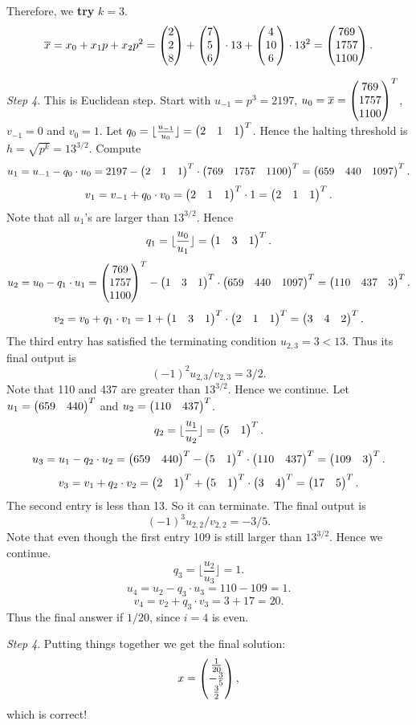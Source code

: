 \documentclass[12pt]{article}
\theoremstyle{plain}
\begin{document}
Therefore, we {\bf try} $k=3$.
$$\overline{x} = x_0 + x_1p+x_2p^2 = \begin{pmatrix}2\\2\\8\end{pmatrix} + \begin{pmatrix}7\\5\\6\end{pmatrix} \cdot 13 + \begin{pmatrix}4\\10\\6\end{pmatrix} \cdot 13^2 = \begin{pmatrix}769\\1757\\1100\end{pmatrix}.$$

\emph{Step 4}. This is Euclidean step. Start with $u_{-1} = p^3 = 2197$, $u_0=\overline{x} = \begin{pmatrix}769\\1757\\1100\end{pmatrix}^T$, $v_{-1} = 0$ and $v_0=1$. Let $q_0 = \lfloor \frac{u_{-1}}{u_0} \rfloor = \begin{pmatrix}2 & 1 & 1\end{pmatrix}^T$. Hence the halting threshold is $h = \sqrt{p^k} = 13^{3/2}$. Compute
$$u_1 = u_{-1} - q_0\cdot u_0 = 2197 - \begin{pmatrix}2 & 1 & 1\end{pmatrix}^T \cdot \begin{pmatrix}769 & 1757 & 1100\end{pmatrix}^T = \begin{pmatrix}659 & 440 & 1097\end{pmatrix}^T.$$
$$v_1 = v_{-1} + q_0\cdot v_0 = \begin{pmatrix}2 & 1 & 1\end{pmatrix}^T \cdot 1 = \begin{pmatrix}2 & 1 & 1\end{pmatrix}^T.$$
Note that all $u_1$'s are larger than $13^{3/2}$. Hence
$$q_1 = \lfloor \frac{u_0}{u_1} \rfloor = \begin{pmatrix}1 & 3 & 1\end{pmatrix}^T.$$
$$u_2 = u_0 - q_1\cdot u_1 = \begin{pmatrix}769\\1757\\1100\end{pmatrix}^T - \begin{pmatrix}1 & 3 & 1\end{pmatrix}^T \cdot \begin{pmatrix}659 & 440 & 1097\end{pmatrix}^T = \begin{pmatrix}110 & 437 & 3\end{pmatrix}^T.$$
$$v_2 = v_0 + q_1\cdot v_1 = 1 + \begin{pmatrix}1 & 3 & 1\end{pmatrix}^T \cdot \begin{pmatrix}2 & 1 & 1\end{pmatrix}^T = \begin{pmatrix}3&4&2\end{pmatrix}^T.$$
The third entry has satisfied the terminating condition $u_{2,3} = 3 < 13$. Thus its final output is 
$$(-1)^2u_{2,3}/v_{2,3} = 3/2.$$
Note that 110 and 437 are greater than $13^{3/2}$. Hence we continue. Let $u_1 = \begin{pmatrix}659 & 440\end{pmatrix}^T$ and $u_2 = \begin{pmatrix}110 & 437\end{pmatrix}^T$.
$$q_2 = \lfloor \frac{u_1}{u_2} \rfloor = \begin{pmatrix}5 & 1\end{pmatrix}^T.$$
$$u_3 = u_1 - q_2\cdot u_2 = \begin{pmatrix}659 & 440\end{pmatrix}^T - \begin{pmatrix}5 & 1\end{pmatrix}^T \cdot \begin{pmatrix}110 & 437\end{pmatrix}^T = \begin{pmatrix}109 & 3\end{pmatrix}^T.$$
$$v_3 = v_1 + q_2\cdot v_2 = \begin{pmatrix}2 & 1\end{pmatrix}^T + \begin{pmatrix}5 & 1\end{pmatrix}^T \cdot \begin{pmatrix}3&4\end{pmatrix}^T = \begin{pmatrix}17 & 5\end{pmatrix}^T.$$
The second entry is less than 13. So it can terminate. The final output is 
$$(-1)^3u_{2,2}/v_{2,2} = -3/5.$$
Note that even though the first entry 109 is still larger than $13^{3/2}$. Hence we continue. 
$$q_3 = \lfloor \frac{u_2}{u_3} \rfloor = 1.$$
$$u_4 = u_2 - q_3\cdot u_3 = 110 - 109 = 1.$$
$$v_4 = v_2 + q_3\cdot v_3 = 3 + 17 = 20.$$
Thus the final answer if $1/20$, since $i=4$ is even.

\emph{Step 4}. Putting things together we get the final solution:
$$x = \begin{pmatrix}\frac{1}{20} \\ -\frac{3}{5} \\ \frac{3}{2}\end{pmatrix},$$
which is correct!
\end{document}

